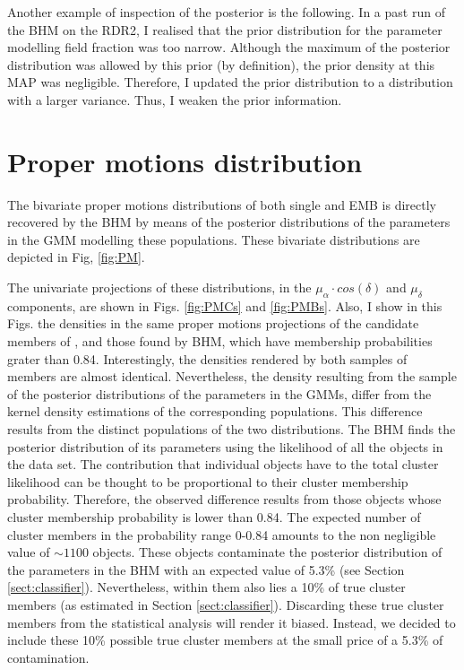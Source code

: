 Another example of inspection of the posterior is the following. In a past run of the BHM on the RDR2, I realised that the prior distribution for the parameter modelling field fraction was too narrow. Although the maximum of the posterior distribution was allowed by this prior (by definition), the prior density at this MAP was negligible. Therefore, I updated the prior distribution to a distribution with a larger variance. Thus, I weaken the prior information.


\section{Proper motions distribution}
The bivariate proper motions distributions of both single and EMB is directly recovered by the BHM by means of the posterior distributions of the parameters in the GMM modelling these populations.
These bivariate distributions are depicted in Fig, \ref{fig:PM}.

The univariate projections of these distributions, in the $\mu_{\alpha}\cdot cos(\delta)$ and $\mu_{\delta}$ components, are shown in Figs. \ref{fig:PMCs} and \ref{fig:PMBs}. Also, I show in this Figs. the densities in the same proper motions projections of the candidate members of \citet{Bouy2015}, and those found by BHM, which have membership probabilities grater than 0.84. Interestingly, the densities rendered by both samples of members are almost identical. Nevertheless, the density resulting from the sample of the posterior distributions of the parameters in the GMMs, differ from the kernel density estimations of the corresponding populations. This difference results from the distinct populations of the two distributions. The BHM finds the posterior distribution of its parameters using the likelihood of all the objects in the data set. The contribution that individual objects have to the total cluster likelihood can be thought to be proportional to their cluster membership probability. Therefore, the observed difference results from those objects whose cluster membership probability is lower than 0.84. The expected number of cluster members in the probability range 0-0.84 amounts to the non negligible value of $\sim 1100$ objects. These objects contaminate the posterior distribution of the parameters in the BHM with an expected value of 5.3\% (see Section \ref{sect:classifier}). Nevertheless, within them also lies a 10\% of true cluster members (as estimated in Section \ref{sect:classifier}). Discarding these true cluster members from the statistical analysis will render it biased. Instead, we decided to include these 10\% possible true cluster members at the small price of a 5.3\% of contamination.

